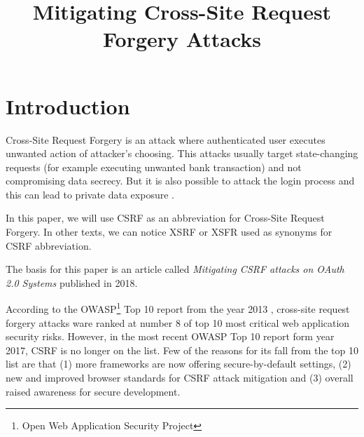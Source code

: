 \documentclass[journal,a4paper,twoside]{template/IEEEtran}
\begin{document}
\title{Mitigating Cross-Site Request Forgery Attacks}


\address{University of Ljubljana, Faculty of Computer and Information Science, Večna pot 113, 1000 Ljubljana, Slovenia\\
E-mail: mm3058@student.uni-lj.si}




\maketitle

\IEEEpeerreviewmaketitle

\section{Introduction}
\label{sec_introduction}

Cross-Site Request Forgery is an attack where authenticated user executes unwanted action of attacker's choosing. This attacks usually target state-changing requests (for example executing unwanted bank transaction) and not compromising data secrecy. But it is also possible to attack the login process and this can lead to private data exposure \cite{barth2008robust}.

In this paper, we will use CSRF as an abbreviation for Cross-Site Request Forgery. In other texts, we can notice XSRF or XSFR used as synonyms for CSRF abbreviation.

The basis for this paper is an article called \textit{Mitigating CSRF attacks on OAuth 2.0 Systems} \cite{li2018mitigating} published in 2018.

According to the OWASP\footnote{Open Web Application Security Project} Top 10 report from the year 2013 \cite{owasptopten}, cross-site request forgery attacks ware ranked at number 8 of top 10 most critical web application security risks. However, in the most recent OWASP Top 10 report form year 2017, CSRF is no longer on the list. Few of the reasons for its fall from the top 10 list are that \cite{owaspthefallofcsrf} (1) more frameworks are now offering secure-by-default settings, (2) new and improved browser standards for CSRF attack mitigation and (3) overall raised awareness for secure development.
\end{document}
